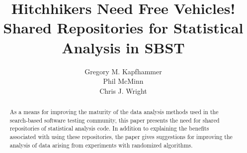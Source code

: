 \documentclass{sig-alternate}
\begin{document}
\title{Hitchhikers Need Free Vehicles! \\ Shared Repositories for Statistical Analysis in SBST \vspace*{-.05in}}


\author{
\alignauthor
Gregory M. Kapfhammer\\
\alignauthor
Phil McMinn\\
\alignauthor
Chris J. Wright\\
}

\maketitle

\begin{abstract}
  As a means for improving the maturity of the data analysis methods used in the search-based software testing
  community, this paper presents the need for shared repositories of statistical analysis code. In addition to
  explaining the benefits associated with using these repositories, the paper gives suggestions for improving the
  analysis of data arising from experiments with randomized algorithms. \vspace*{-1em}
\end{abstract}






\vspace*{-.5em}

\scriptsize


\end{document}
